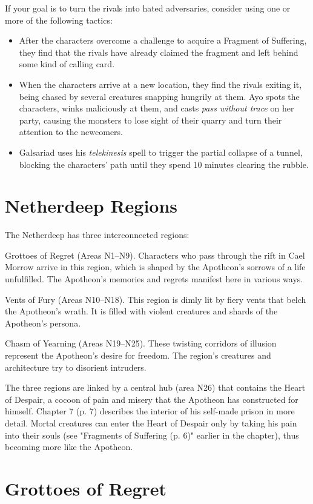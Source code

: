 \documentclass[letterpaper, 11pt, bg=full, twocolumn]{dndbook}
\begin{document}
If your goal is to turn the rivals into hated adversaries, consider using one or more of the following tactics:

\begin{itemize}
\item After the characters overcome a challenge to acquire a Fragment of Suffering, they find that the rivals have already claimed the fragment and left behind some kind of calling card.
\item When the characters arrive at a new location, they find the rivals exiting it, being chased by several creatures snapping hungrily at them. Ayo spots the characters, winks maliciously at them, and casts \textit{pass without trace} on her party, causing the monsters to lose sight of their quarry and turn their attention to the newcomers.
\item Galsariad uses his \textit{telekinesis} spell to trigger the partial collapse of a tunnel, blocking the characters' path until they spend 10 minutes clearing the rubble.
\end{itemize}
\section{Netherdeep Regions}

The Netherdeep has three interconnected regions:

Grottoes of Regret (Areas N1--N9). Characters who pass through the rift in Cael Morrow arrive in this region, which is shaped by the Apotheon's sorrows of a life unfulfilled. The Apotheon's memories and regrets manifest here in various ways.

Vents of Fury (Areas N10--N18). This region is dimly lit by fiery vents that belch the Apotheon's wrath. It is filled with violent creatures and shards of the Apotheon's persona.

Chasm of Yearning (Areas N19--N25). These twisting corridors of illusion represent the Apotheon's desire for freedom. The region's creatures and architecture try to disorient intruders.

The three regions are linked by a central hub (area N26) that contains the Heart of Despair, a cocoon of pain and misery that the Apotheon has constructed for himself. Chapter 7 (p. 7) describes the interior of his self-made prison in more detail. Mortal creatures can enter the Heart of Despair only by taking his pain into their souls (see "Fragments of Suffering (p. 6)" earlier in the chapter), thus becoming more like the Apotheon.
\section{Grottoes of Regret}
\end{document}
